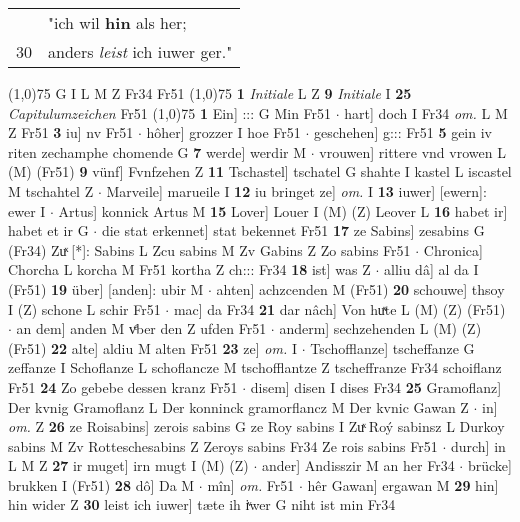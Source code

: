 \documentclass[8pt,a4paper,notitlepage]{article}
\begin{document}
\begin{table}[ht]
\begin{minipage}[t]{0.5\linewidth}
\begin{tabular}{rl}
 & "ich wil \textbf{hin} als her;\\ 
30 & anders \textit{leist} ich iuwer ger."\\ 
\end{tabular}
\scriptsize
\line(1,0){75} \newline
G I L M Z Fr34 Fr51 \newline
\line(1,0){75} \newline
\textbf{1} \textit{Initiale} L Z  \textbf{9} \textit{Initiale} I  \textbf{25} \textit{Capitulumzeichen} Fr51  \newline
\line(1,0){75} \newline
\textbf{1} Ein] ::: G Min Fr51  $\cdot$ hart] doch I Fr34 \textit{om.} L M Z Fr51 \textbf{3} iu] nv Fr51  $\cdot$ hôher] grozzer I hoe Fr51  $\cdot$ geschehen] g::: Fr51 \textbf{5} gein iv riten zechamphe chomende G \textbf{7} werde] werdir M  $\cdot$ vrouwen] rittere vnd vrowen L (M) (Fr51) \textbf{9} vünf] Fvnfzehen Z \textbf{11} Tschastel] tschatel G shahte I kastel L iscastel M tschahtel Z  $\cdot$ Marveile] marueile I \textbf{12} iu bringet ze] \textit{om.} I \textbf{13} iuwer] [ewern]: ewer I  $\cdot$ Artus] konnick Artus M \textbf{15} Lover] Louer I (M) (Z) Leover L \textbf{16} habet ir] habet et ir G  $\cdot$ die stat erkennet] stat bekennet Fr51 \textbf{17} ze Sabins] zesabins G (Fr34) Zuͯ [*]: Sabins  L Zcu sabins M Zv Gabins Z Zo sabins Fr51  $\cdot$ Chronica] Chorcha L korcha M Fr51 kortha Z ch::: Fr34 \textbf{18} ist] was Z  $\cdot$ alliu dâ] al da I (Fr51) \textbf{19} über] [anden]: ubir M  $\cdot$ ahten] achzcenden M (Fr51) \textbf{20} schouwe] thsoy I (Z) schone L schir Fr51  $\cdot$ mac] da Fr34 \textbf{21} dar nâch] Von huͯte L (M) (Z) (Fr51)  $\cdot$ an dem] anden M vͤber den Z ufden Fr51  $\cdot$ anderm] sechzehenden L (M) (Z) (Fr51) \textbf{22} alte] aldiu M alten Fr51 \textbf{23} ze] \textit{om.} I  $\cdot$ Tschofflanze] tscheffanze G zeffanze I Schoflanze L schoflancze M tschofflantze Z tscheffranze Fr34 schoiflanz Fr51 \textbf{24} Zo gebebe dessen kranz Fr51  $\cdot$ disem] disen I dises Fr34 \textbf{25} Gramoflanz] Der kvnig Gramoflanz L Der konninck gramorflancz M Der kvnic Gawan Z  $\cdot$ in] \textit{om.} Z \textbf{26} ze Roisabins] zerois sabins G ze Roy sabins I Zuͯ Roý sabinsz L Durkoy sabins M Zv Rotteschesabins Z Zeroys sabins Fr34 Ze rois sabins Fr51  $\cdot$ durch] in L M Z \textbf{27} ir muget] irn mugt I (M) (Z)  $\cdot$ ander] Andisszir M an her Fr34  $\cdot$ brücke] brukken I (Fr51) \textbf{28} dô] Da M  $\cdot$ mîn] \textit{om.} Fr51  $\cdot$ hêr Gawan] ergawan M \textbf{29} hin] hin wider Z \textbf{30} leist ich iuwer] tæte ih iͮwer G niht ist min Fr34 \newline

\end{minipage}
\end{table}
\end{document}
